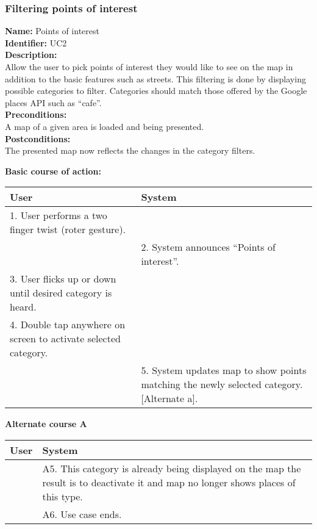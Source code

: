 \documentclass[11pt,twoside,a4paper]{article}
\begin{document}
\subsubsection{Filtering points of interest}
\noindent
\textbf{Name:} Points of interest\\
\textbf{Identifier:} UC2\\
\textbf{Description:}\\
Allow the user to pick points of interest they would like to see on the
map in addition to the basic features such as streets. This filtering is
done by displaying possible categories to filter. Categories should
match those offered by the Google places API such as ``cafe''.\\
\textbf{Preconditions:}\\
A map of a given area is loaded and being presented.\\
\textbf{Postconditions:}\\
The presented map now reflects the changes in the category filters.

\noindent
\textbf{Basic course of action:}\\
\begin{tabularx}{\textwidth}{ |X|X| }
  \textbf{User} & \textbf{System}\\
  \hline
  1. User performs a two finger twist (roter gesture). & \\
  \hline
  & 2. System announces ``Points of interest''.\\
  \hline
  3. User flicks up or down until desired category is heard. & \\
  \hline
  4. Double tap anywhere on screen to activate selected
  category. & \\
  \hline
  & 5. System updates map to show points matching the newly selected
  category. [Alternate a].\\
  \hline
\end{tabularx}

\noindent
\textbf{Alternate course A}\\
\begin{tabularx}{\textwidth}{ |X|X| }
  \textbf{User} & \textbf{System}\\
  \hline
  & A5. This category is already being displayed on the map the result
  is to deactivate it and map no longer shows places of this type.\\
  \hline
  & A6. Use case ends.\\
  \hline
\end{tabularx}
\end{document}
